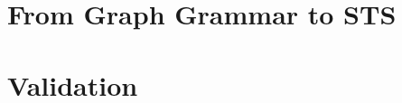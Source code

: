 \documentclass[a4paper]{report}
\theoremstyle{definition}
\begin{document}
\begin{comment}
	\title{\textbf{Model-Based Testing with\\Graph Grammars}}
	\author{\textbf{MSc Thesis} \textit{(Afstudeerscriptie)}\\
	\\
	written by
	\\
	\\
	Vincent de Bruijn\\
	\\
	Formal Methods \& Tools,\\
	University of Twente,
	\\Enschede,\\
	The Netherlands\\
	\\
	\texttt{v.debruijn@student.utwente.nl}}
	\date{\today}
	\maketitle
	
	
	
	\newpage
	\tableofcontents
  \newpage

  \newpage
	\chapter{Introduction}\label{chapter:introduction}
	
	
	
	\newpage
	\chapter{Background}\label{chapter:background}
	
	
	
	
	
	
	
	\end{comment}
	
	\newpage
	\chapter{From Graph Grammar to STS}\label{chapter:gg_to_sts}
	
	
	
	
	\newpage
	\chapter{Validation}\label{chapter:validation}
	
	
	
	
	
\end{document}
